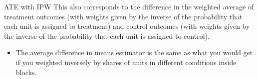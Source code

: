 \documentclass[
  11pt,
  ignorenonframetext,
]{beamer}
\providecommand{\tightlist}{%
  \setlength{\itemsep}{0pt}\setlength{\parskip}{0pt}}\usepackage{longtable,booktabs,array}
\begin{document}
\begin{frame}{ATE with IPW}
\protect\hypertarget{ate-with-ipw}{}
This also corresponds to the difference in the weighted average of
treatment outcomes (with weights given by the inverse of the probability
that each unit is assigned to treatment) and control outcomes (with
weights given by the inverse of the probability that each unit is
assigned to control).

\begin{itemize}
\tightlist
\item
  The average difference in means estimator is the same as what you
  would get if you weighted inversely by shares of units in different
  conditions inside blocks.
\end{itemize}
\end{frame}
\end{document}

